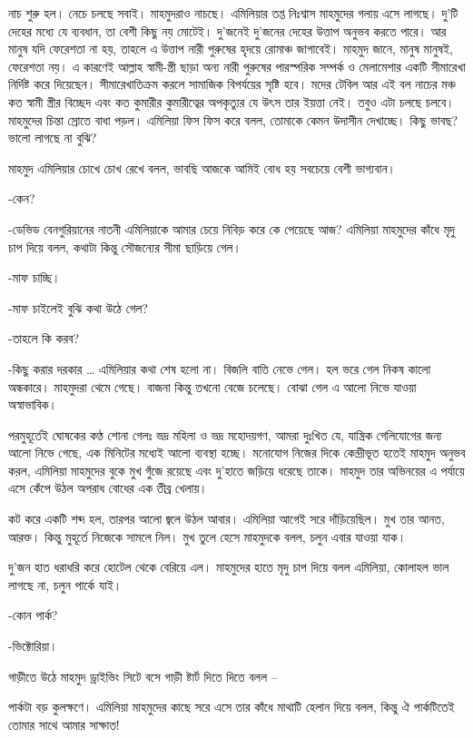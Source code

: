 \documentclass[
]{book}
\begin{document}
নাচ শুরু হল। নেচে চলছে সবাই। মাহমুদরাও নাচছে। এমিলিয়ার তপ্ত নিঃশ্বাস মাহমুদের গলায় এসে লাগছে। দু'টি দেহের মধ্যে যে ব্যবধান, তা বেশী কিছু নয় মোটেই। দু'জনেই দু'জনের দেহের উত্তাপ অনুভব করতে পারে। আর মানুষ যদি ফেরেশতা না হয়, তাহলে এ উত্তাপ নারী পুরুষের হৃদয়ে রোমাঞ্চ জাগাবেই। মাহমুদ জানে, মানুষ মানুষই, ফেরেশতা নয়। এ কারণেই আল্লাহ স্বামী-স্ত্রী ছাড়া অন্য নারী পুরুষের পারস্পরিক সম্পর্ক ও মেলামেশার একটি সীমারেখা নির্দিষ্ট করে দিয়েছেন। সীমারেখাতিক্রম করলে সামাজিক বিপর্যয়ের সৃষ্টি হবে। মদের টেবিল আর এই বল নাচের মঞ্চ কত স্বামী স্ত্রীর বিচ্ছেদ এবং কত কুমারীর কুমারীত্বের অপকৃত্যুর যে উৎস তার ইয়ত্তা নেই। তবুও এটা চলছে চলবে। মাহমুদের চিন্তা স্রোতে বাধা পড়ল। এমিলিয়া ফিস ফিস করে বলল, তোমাকে কেমন উদাসীন দেখাচ্ছে। কিছু ভাবছ? ভালো লাগছে না বুঝি?

মাহমুদ এমিলিয়ার চোখে চোখ রেখে বলল, ভাবছি আজকে আমিই বোধ হয় সবচেয়ে বেশী ভাগ্যবান।

-কেন?

-ডেভিড বেনগুরিয়ানের নাতনী এমিলিয়াকে আমার চেয়ে নিবিড় করে কে পেয়েছে আজ? এমিলিয়া মাহমুদের কাঁধে মৃদু চাপ দিয়ে বলল, কথাটা কিন্তু সৌজন্যের সীমা ছাড়িয়ে গেল।

-মাফ চাচ্ছি।

-মাফ চাইলেই বুঝি কথা উঠে গেল?

-তাহলে কি করব?

-কিছু করার দরকার \ldots{} এমিলিয়ার কথা শেষ হলো না। বিজলি বাতি নেভে গেল। হল ভরে গেল নিকষ কালো অন্ধকারে। মাহমুদরা থেমে গেছে। বাজনা কিন্তু তখনো বেজে চলেছে। বোঝা গেল এ আলো নিভে যাওয়া অস্বাভাবিক।

পরমুহূর্তেই ঘোষকের কণ্ঠ শোনা গেলঃ ভদ্র মহিলা ও ভদ্র মহোদয়গণ, আমরা দুঃখিত যে, যান্ত্রিক গেলিযোগের জন্য আলো নিভে গেছে, এক মিনিটের মধ্যেই আলো ব্যবস্থা হচ্ছে। মনোযোগ নিজের দিকে কেন্দ্রীভূত হতেই মাহমুদ অনুভব করল, এমিলিয়া মাহমুদের বুকে মুখ গুঁজে রয়েছে এবং দু'হাতে জড়িয়ে ধরেছে তাকে। মাহমুদ তার অভিনয়ের এ পর্যায়ে এসে কেঁপে উঠল অপরাধ বোধের এক তীব্র খেলায়।

কট করে একটি শব্দ হল, তারপর আলো জ্বলে উঠল আবার। এমিলিয়া আগেই সরে দাঁড়িয়েছিল। মুখ তার আনত, আরক্ত। কিন্তু মুহূর্তে নিজেকে সামলে নিল। মুখ তুলে হেসে মাহমুদকে বলল, চলুন এবার যাওয়া যাক।

দু'জন হাত ধরাধরি করে হোটেল থেকে বেরিয়ে এল। মাহমুদের হাতে মৃদু চাপ দিয়ে বলল এমিলিয়া, কোলাহল ভাল লাগছে না, চলুন পার্কে যাই।

-কোন পার্ক?

-ভিক্টোরিয়া।

গাড়ীতে উঠে মাহমুদ ড্রাইভিং সিটে বসে গাড়ী ষ্টার্ট দিতে দিতে বলল --

পার্কটা বড় কুলক্ষণে। এমিলিয়া মাহমুদের কাছে সরে এসে তার কাঁধে মাথাটি হেলান দিয়ে বলল, কিন্তু ঐ পার্কটিতেই তোমার সাথে আমার সাক্ষাত!
\end{document}
